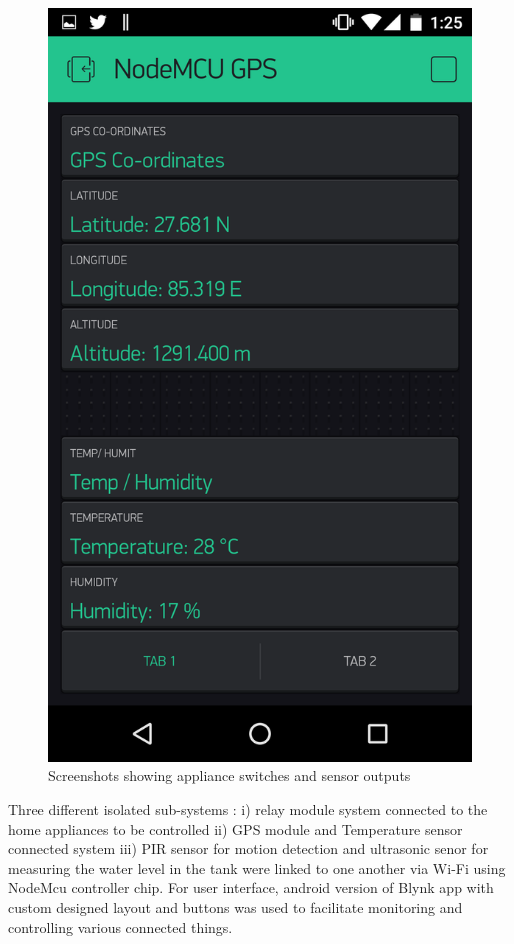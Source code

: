 \documentclass[journal,twoside]{IEEEtran}
\begin{document}
\begin{figure}[!b]
\begin{minipage}[t]{.45\linewidth}
    \end{minipage}%
        \hfill%
    \begin{minipage}[t]{.45\linewidth}
        \includegraphics[width=\linewidth]{figure4b}
    \end{minipage}%
    \caption{Screenshots showing appliance switches and sensor outputs}
    \label{fig:Screenshot1}
\end{figure}

Three different isolated sub-systems : i) relay module system
connected to the home appliances to be controlled ii) GPS
module and Temperature sensor connected system iii) PIR
sensor for motion detection and ultrasonic senor for measuring
the water level in the tank were linked to one another via Wi-Fi
using NodeMcu controller chip. For user interface, android
version of Blynk app with custom designed layout and buttons
was used to facilitate monitoring and controlling various
connected things.
\end{document}
